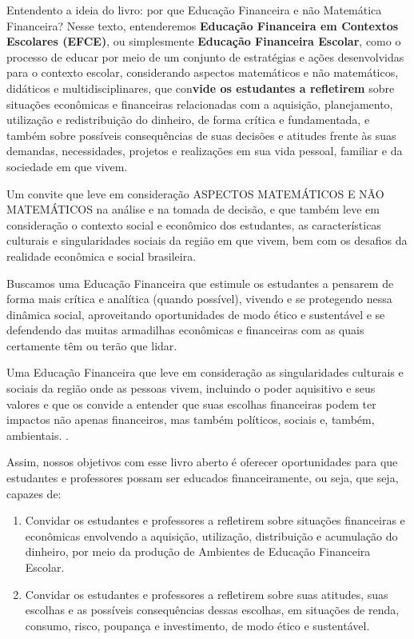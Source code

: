 \begin{apresentacao}{Entendento a ideia do livro: por que Educação Financeira e não Matemática Financeira?}
Nesse texto, entenderemos \textbf{Educação Financeira em Contextos Escolares (EFCE)}, ou simplesmente \textbf{Educação Financeira Escolar}, como o processo de educar por meio de um conjunto de estratégias e ações desenvolvidas para o contexto escolar, considerando aspectos matemáticos e não matemáticos, didáticos e multidisciplinares, que con\textbf{vide os estudantes a refletirem} sobre situações econômicas e financeiras relacionadas com a aquisição, planejamento, utilização e redistribuição do dinheiro, de forma crítica e fundamentada, e também sobre possíveis consequências de suas decisões e atitudes frente às suas demandas, necessidades, projetos e realizações em sua vida pessoal, familiar e da sociedade em que vivem.

Um convite que leve em consideração ASPECTOS MATEMÁTICOS E NÃO MATEMÁTICOS na análise e na tomada de decisão, e que também leve em consideração o contexto social e econômico dos estudantes, as características culturais e singularidades sociais da região em que vivem, bem com os desafios da realidade econômica e social brasileira.

Buscamos uma Educação Financeira que estimule os estudantes a pensarem de forma mais crítica e analítica (quando possível), vivendo e se protegendo nessa dinâmica social, aproveitando oportunidades de modo ético e sustentável e se defendendo das muitas armadilhas econômicas e financeiras com as quais certamente têm ou terão que lidar. 

Uma Educação Financeira que leve em consideração as singularidades culturais e sociais da região onde as pessoas vivem, incluindo o poder aquisitivo e seus valores e que os convide a entender que suas escolhas financeiras podem ter impactos não apenas financeiros, mas também políticos, sociais e, também, ambientais. \citep{muniz2016a}.


Assim, nossos objetivos com esse livro aberto é oferecer oportunidades para que estudantes e professores possam ser educados financeiramente, ou seja, que seja, capazes de:

\begin{enumerate}[label=\arabic* --, leftmargin=0pt]
  \item Convidar os estudantes e professores a refletirem sobre situações financeiras e econômicas envolvendo a aquisição, utilização, distribuição e acumulação do dinheiro, por meio da produção de Ambientes de Educação Financeira Escolar.

  \item Convidar os estudantes e professores a refletirem sobre suas atitudes, suas escolhas e as possíveis consequências dessas escolhas, em situações de renda, consumo, risco, poupança e investimento, de modo ético e sustentável. 


\end{enumerate}
\end{apresentacao}
